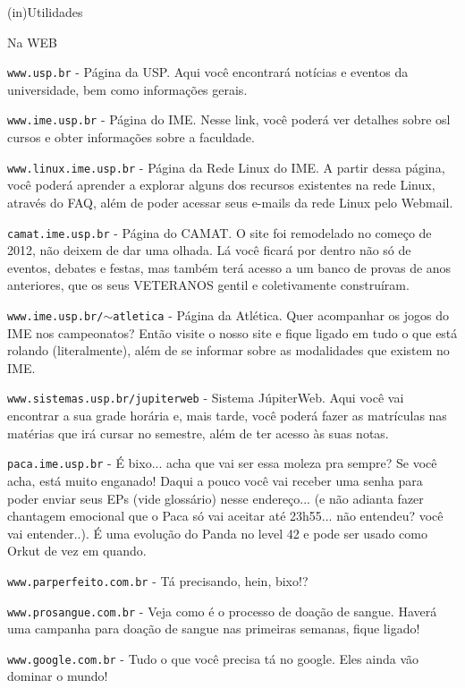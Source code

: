 \begin{secao}{(in)Utilidades}

\begin{subsecao}{Na WEB}

{\tt www.usp.br} - Página da USP. Aqui você encontrará notícias e eventos da
universidade, bem como informações gerais.

{\tt www.ime.usp.br} - Página do IME.
Nesse link, você poderá ver detalhes sobre osl
cursos e obter informações sobre a faculdade.

{\tt www.linux.ime.usp.br} - Página da Rede Linux do IME.
A partir dessa página, você
poderá aprender a explorar alguns dos recursos existentes na rede Linux,
através do FAQ, além de poder acessar seus e-mails da rede Linux pelo Webmail.

{\tt camat.ime.usp.br} - Página do CAMAT.
O site foi remodelado no começo de 2012, não deixem de dar uma olhada. Lá você ficará por dentro não só de eventos, debates e festas, mas também terá acesso a um banco de provas de anos anteriores, que os seus VETERANOS gentil e coletivamente construíram.

{\tt www.ime.usp.br/$\sim$atletica} - Página da Atlética.
Quer acompanhar os jogos do IME
nos campeonatos? Então visite o nosso site e fique ligado em tudo o que está
rolando (literalmente), além de se informar sobre as modalidades que existem no
IME.

{\tt www.sistemas.usp.br/jupiterweb} - Sistema JúpiterWeb.
Aqui você vai encontrar a
sua grade horária e, mais tarde, você poderá fazer as matrículas nas matérias
que irá cursar no semestre, além de ter acesso às suas notas.

{\tt paca.ime.usp.br} - É bixo... acha que vai ser essa moleza pra sempre? Se você acha, está muito enganado! Daqui a pouco você vai receber uma senha para poder enviar seus EPs (vide glossário) nesse endereço... (e não adianta fazer chantagem emocional que o Paca só vai aceitar até 23h55... não entendeu? você vai entender..). É uma evolução do Panda no level 42 e pode ser usado como Orkut de vez em quando. 

{\tt www.parperfeito.com.br} - Tá precisando, hein, bixo!?

{\tt www.prosangue.com.br} - Veja como é o processo de doação de sangue. Haverá
uma campanha para doação de sangue nas primeiras semanas, fique ligado!

{\tt www.google.com.br} - Tudo o que você precisa tá no google. Eles ainda vão
dominar o mundo!


\end{subsecao}
\end{secao}
